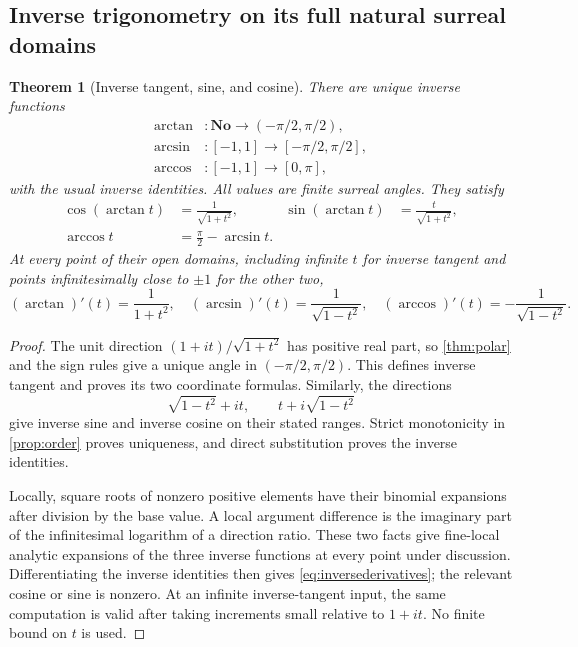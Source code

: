 \documentclass[11pt]{article}
\numberwithin{equation}{section}
\newtheorem{theorem}{Theorem}[section]
\theoremstyle{definition}
\newcommand{\No}{\mathbf{No}}
\begin{document}
\subsection{Inverse trigonometry on its full natural surreal domains}
\begin{theorem}[Inverse tangent, sine, and cosine]\label{thm:inverse}
There are unique inverse functions
\begin{align*}
 \arctan &: \No\longrightarrow(-\pi/2,\pi/2),\\
 \arcsin &: [-1,1]\longrightarrow[-\pi/2,\pi/2],\\
 \arccos &: [-1,1]\longrightarrow[0,\pi],
\end{align*}
with the usual inverse identities. All values are finite surreal angles. They satisfy
\begin{align}
 \cos(\arctan t)&=\frac1{\sqrt{1+t^2}},&
 \sin(\arctan t)&=\frac{t}{\sqrt{1+t^2}},\\
 \arccos t&=\frac\pi2-\arcsin t.
\end{align}
At every point of their open domains, including infinite $t$ for inverse tangent and points infinitesimally close to $\pm1$ for the other two,
\begin{equation}\label{eq:inversederivatives}
 (\arctan)'(t)=\frac1{1+t^2},\quad
 (\arcsin)'(t)=\frac1{\sqrt{1-t^2}},\quad
 (\arccos)'(t)=-\frac1{\sqrt{1-t^2}}.
\end{equation}
\end{theorem}
\begin{proof}
The unit direction $(1+it)/\sqrt{1+t^2}$ has positive real part, so \cref{thm:polar} and the sign rules give a unique angle in $(-\pi/2,\pi/2)$. This defines inverse tangent and proves its two coordinate formulas. Similarly, the directions
\[
 \sqrt{1-t^2}+it,\qquad t+i\sqrt{1-t^2}
\]
give inverse sine and inverse cosine on their stated ranges. Strict monotonicity in \cref{prop:order} proves uniqueness, and direct substitution proves the inverse identities.

Locally, square roots of nonzero positive elements have their binomial expansions after division by the base value. A local argument difference is the imaginary part of the infinitesimal logarithm of a direction ratio. These two facts give fine-local analytic expansions of the three inverse functions at every point under discussion. Differentiating the inverse identities then gives \eqref{eq:inversederivatives}; the relevant cosine or sine is nonzero. At an infinite inverse-tangent input, the same computation is valid after taking increments small relative to $1+it$. No finite bound on $t$ is used.
\end{proof}
\end{document}
